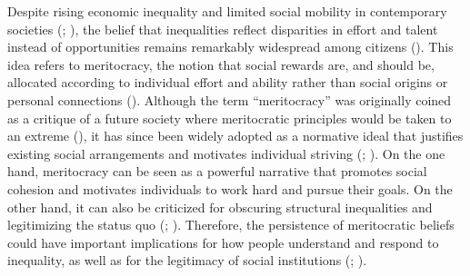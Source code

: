 \documentclass[
  13pt,
]{article}
\begin{document}
Despite rising economic inequality and limited social mobility in
contemporary societies (; ), the belief that inequalities reflect disparities in
effort and talent instead of opportunities remains remarkably widespread
among citizens (). This idea
refers to meritocracy, the notion that social rewards are, and should
be, allocated according to individual effort and ability rather than
social origins or personal connections
(). Although the term
``meritocracy'' was originally coined as a critique of a future society
where meritocratic principles would be taken to an extreme
(), it has since been widely
adopted as a normative ideal that justifies existing social arrangements
and motivates individual striving
(;
). On the one hand,
meritocracy can be seen as a powerful narrative that promotes social
cohesion and motivates individuals to work hard and pursue their goals.
On the other hand, it can also be criticized for obscuring structural
inequalities and legitimizing the status quo
(;
). Therefore, the
persistence of meritocratic beliefs could have important implications
for how people understand and respond to inequality, as well as for the
legitimacy of social institutions
(;
).
\end{document}
